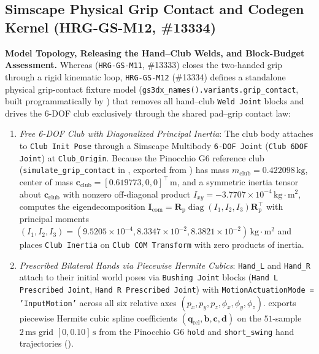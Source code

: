\documentclass[11pt,a4paper]{article}
\begin{document}
\subsection{Simscape Physical Grip Contact and Codegen Kernel (HRG-GS-M12, \#13334)}
\textbf{Model Topology, Releasing the Hand--Club Welds, and Block-Budget Assessment.}
Whereas  (\texttt{HRG-GS-M11}, \#13333) closes the two-handed grip through a rigid kinematic loop, \texttt{HRG-GS-M12} (\#13334) defines a standalone physical grip-contact fixture model  (\texttt{gs3dx\_names().variants.grip\_contact}, built programmatically by ) that removes all hand--club \texttt{Weld Joint} blocks and drives the 6-DOF club exclusively through the shared pad--grip contact law:
\begin{enumerate}[leftmargin=*,noitemsep]
\item \textit{Free 6-DOF Club with Diagonalized Principal Inertia}: The club body attaches to \texttt{Club Init Pose} through a Simscape Multibody \texttt{6-DOF Joint} (\texttt{Club 6DOF Joint}) at \texttt{Club\_Origin}. Because the Pinocchio G6 reference club (\texttt{simulate\_grip\_contact} in , exported from ) has mass $m_{\mathrm{club}} = 0.422098\,\mathrm{kg}$, center of mass $\mathbf{c}_{\mathrm{club}} = [0.619773, 0, 0]^{\top}\,\mathrm{m}$, and a symmetric inertia tensor about $\mathbf{c}_{\mathrm{club}}$ with nonzero off-diagonal product $I_{xy} = -3.7707\times 10^{-4}\,\mathrm{kg\cdot m^2}$,  computes the eigendecomposition $\mathbf{I}_{\mathrm{com}} = \mathbf{R}_{\mathrm{p}}\operatorname{diag}(I_1, I_2, I_3)\mathbf{R}_{\mathrm{p}}^{\top}$ with principal moments $(I_1, I_2, I_3) = (9.5205\times 10^{-4}, 8.3347\times 10^{-2}, 8.3821\times 10^{-2})\,\mathrm{kg\cdot m^2}$ and places \texttt{Club Inertia} on \texttt{Club COM Transform} with zero products of inertia.
\item \textit{Prescribed Bilateral Hands via Piecewise Hermite Cubics}: \texttt{Hand\_L} and \texttt{Hand\_R} attach to their initial world poses via \texttt{Bushing Joint} blocks (\texttt{Hand L Prescribed Joint}, \texttt{Hand R Prescribed Joint}) with \texttt{MotionActuationMode = 'InputMotion'} across all six relative axes $(p_x, p_y, p_z, \phi_x, \phi_y, \phi_z)$.  exports piecewise Hermite cubic spline coefficients $(\mathbf{q}_{\mathrm{rel}}, \mathbf{b}, \mathbf{c}, \mathbf{d})$ on the $51$-sample $2\,\mathrm{ms}$ grid $[0, 0.10]\,\mathrm{s}$ from the Pinocchio G6 \texttt{hold} and \texttt{short\_swing} hand trajectories ().

\end{enumerate}
\end{document}
